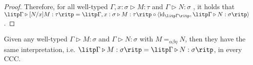 \begin{proof}
Therefore, for all well-typed $ \Gamma , x: \sigma \triangleright M: \tau $ and $ \Gamma \triangleright N: \sigma $ , it holds that $ \litp \Gamma \triangleright [N/x]M: \tau \ritp = \litp \Gamma , x: \sigma \triangleright M: \tau \ritp \circ \langle \textnormal{id}_{\litp \Gamma \ritp} , \litp \Gamma \triangleright N: \sigma \ritp \rangle $.

\end{proof}

\clearpage
\begin{theorem}
\label{theorem:soundness}
Given any well-typed $ \Gamma \triangleright M: \sigma $ and $ \Gamma \triangleright N: \sigma $ with $ M =_{\alpha \beta \eta} N $, then they have the same interpretation, i.e. $ \litp \Gamma \triangleright M: \sigma \ritp = \litp \Gamma \triangleright N: \sigma \ritp $, in every CCC.
\end{theorem}

